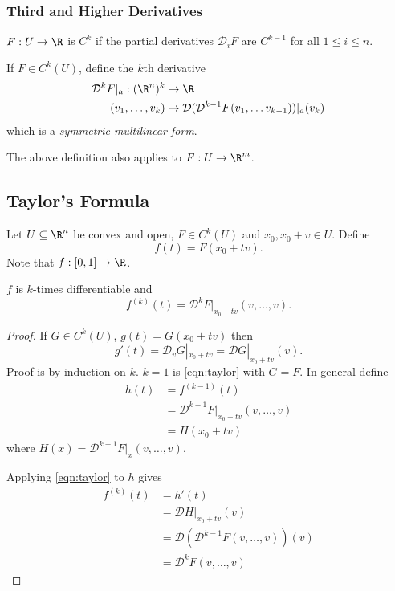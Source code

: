 \documentclass[a4paper]{article}
\newcommand*{\D}{\mathcal{D}}
\theoremstyle{definition}
\begin{document}
\subsubsection{Third and Higher Derivatives}

\begin{definition}[\(C^k\) space]
  \(F: U \to \R\) is \(C^k\) if the partial derivatives \(\D_i F\) are \(C^{k - 1}\) for all \(1 \leq i \leq n\).

  If \(F \in C^k(U)\), define the \(k\)th derivative
  \begin{align*}
    \D^k F|_a: (\R^n)^k &\to \R \\
    (v_1, \dots, v_k) &\mapsto \D( \D^{k - 1} F(v_1, \dots v_{k - 1}))|_a (v_k)
  \end{align*}
  which is a \emph{symmetric multilinear form}.
\end{definition}

\begin{note}
  The above definition also applies to \(F: U \to \R^m\).
\end{note}

\subsection{Taylor's Formula}

Let \(U \subseteq \R^n\) be convex and open, \(F \in C^k(U)\) and \(x_0, x_0 + v \in U\). Define
\[
  f(t) = F(x_0 + tv).
\]
Note that \(f: [0, 1] \to \R\).

\begin{proposition}
  \(f\) is \(k\)-times differentiable and
  \[
    f^{(k)}(t) = \D^k F|_{x_0 + tv} (v, \dots, v).
  \]
\end{proposition}

\begin{proof}
  If \(G \in C^k(U)\), \(g(t) = G(x_0 + tv)\) then
  \begin{equation*}
    \label{eqn:taylor}
    g'(t) = \D_v G|_{x_0 + tv} = \D G|_{x_0 + tv} (v).
    \tag{\(\ast\)}
  \end{equation*}
  Proof is by induction on \(k\). \(k = 1\) is \eqref{eqn:taylor} with \(G = F\). In general define
  \begin{align*}
    h(t) &= f^{(k - 1)}(t) \\
         &= \D^{k - 1} F|_{x_0 + tv} (v, \dots, v) \\
         &= H(x_0 + tv)
  \end{align*}
  where \(H(x) = \D^{k - 1} F|_x(v, \dots, v)\).

  Applying \eqref{eqn:taylor} to \(h\) gives
  \begin{align*}
    f^{(k)}(t) &= h'(t) \\
               &= \D H|_{x_0 + tv}(v) \\
               &= \D( \D^{k - 1} F(v, \dots, v))(v) \\
               &= \D^k F(v, \dots, v)
  \end{align*}
\end{proof}
\end{document}
